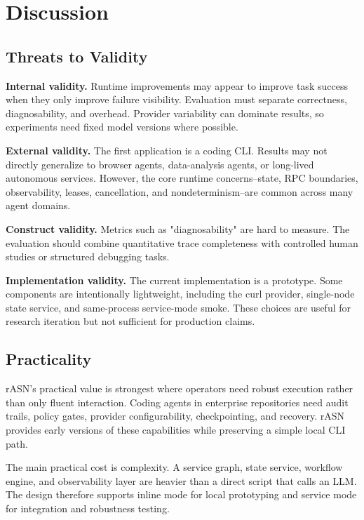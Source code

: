 \documentclass[manuscript,screen,review]{acmart}
\newcommand{\rasn}{rASN\xspace}
\begin{document}
\section{Discussion}

\subsection{Threats to Validity}

\textbf{Internal validity.} Runtime improvements may appear to improve task
success when they only improve failure visibility. Evaluation must separate
correctness, diagnosability, and overhead. Provider variability can dominate
results, so experiments need fixed model versions where possible.

\textbf{External validity.} The first application is a coding CLI. Results may
not directly generalize to browser agents, data-analysis agents, or long-lived
autonomous services. However, the core runtime concerns--state, RPC boundaries,
observability, leases, cancellation, and nondeterminism--are common across many
agent domains.

\textbf{Construct validity.} Metrics such as "diagnosability" are hard to
measure. The evaluation should combine quantitative trace completeness with
controlled human studies or structured debugging tasks.

\textbf{Implementation validity.} The current implementation is a prototype.
Some components are intentionally lightweight, including the curl provider,
single-node state service, and same-process service-mode smoke. These choices
are useful for research iteration but not sufficient for production claims.

\subsection{Practicality}

\rasn's practical value is strongest where operators need robust execution
rather than only fluent interaction. Coding agents in enterprise repositories
need audit trails, policy gates, provider configurability, checkpointing, and
recovery. \rasn provides early versions of these capabilities while preserving a
simple local CLI path.

The main practical cost is complexity. A service graph, state service,
workflow engine, and observability layer are heavier than a direct script that
calls an LLM. The design therefore supports inline mode for local prototyping
and service mode for integration and robustness testing.
\end{document}
